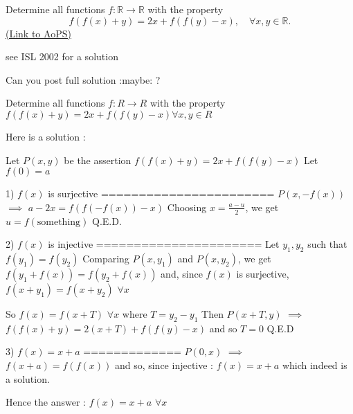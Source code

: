 \begin{problem}
	Determine all functions $f: \mathbb R \to \mathbb R$ with the property
\[f(f(x)+y)=2x+f(f(y)-x), \quad \forall x,y \in \mathbb R.\]
	\flushright \href{https://artofproblemsolving.com/community/c6h386509}{(Link to AoPS)}
\end{problem}



\begin{solution}
	see ISL 2002 for a solution
\end{solution}



\begin{solution}
	Can you post full solution  :maybe:  ?
\end{solution}



\begin{solution}
	\begin{tcolorbox}Determine all functions $f:R \to R$ with the property
$f(f(x)+y)=2x+f(f(y)-x) \forall x,y \in R$\end{tcolorbox}
Here is a solution :

Let $P(x,y)$ be the assertion $f(f(x)+y)=2x+f(f(y)-x)$
Let $f(0)=a$

1) $f(x)$ is surjective
=======================
$P(x,-f(x))$ $\implies$ $a-2x=f(f(-f(x))-x)$
Choosing $x=\frac{a-u}2$, we get $u=f(\text{something})$
Q.E.D.

2) $f(x)$ is injective
======================
Let $y_1,y_2$ such that $f(y_1)=f(y_2)$
Comparing $P(x,y_1)$ and $P(x,y_2)$, we get $f(y_1+f(x))=f(y_2+f(x))$ and, since $f(x)$ is surjective, $f(x+y_1)=f(x+y_2)$ $\forall x$

So $f(x)=f(x+T)$ $\forall x$ where $T=y_2-y_1$
Then $P(x+T,y)$ $\implies$ $f(f(x)+y)=2(x+T)+f(f(y)-x)$ and so $T=0$
Q.E.D

3) $f(x)=x+a$
=============
$P(0,x)$ $\implies$ $f(x+a)=f(f(x))$ and so, since injective : $f(x)=x+a$ which indeed is a solution.

Hence the answer : $\boxed{f(x)=x+a}$ $\forall x$
\end{solution}






